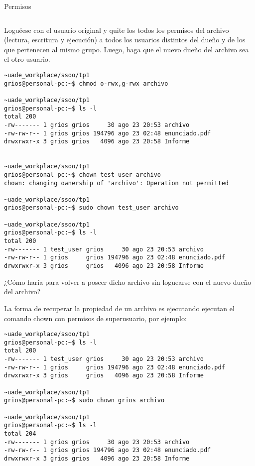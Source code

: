 \begin{section}{Permisos}
\begin{lstlisting}[style=Ubuntu]
\end{lstlisting}

\begin{quoting}
Loguéese con el usuario original y quite los todos los permisos del archivo (lectura, escritura y
ejecución) a todos los usuarios distintos del dueño y de los que pertenecen al mismo grupo. Luego, haga que
el nuevo dueño del archivo sea el otro usuario.
\end{quoting}

\begin{lstlisting}[style=Ubuntu]
~uade_workplace/ssoo/tp1
grios@personal-pc:~$ chmod o-rwx,g-rwx archivo

~uade_workplace/ssoo/tp1
grios@personal-pc:~$ ls -l                     
total 200
-rw------- 1 grios grios     30 ago 23 20:53 archivo
-rw-rw-r-- 1 grios grios 194796 ago 23 02:48 enunciado.pdf
drwxrwxr-x 3 grios grios   4096 ago 23 20:58 Informe


~uade_workplace/ssoo/tp1
grios@personal-pc:~$ chown test_user archivo
chown: changing ownership of 'archivo': Operation not permitted

~uade_workplace/ssoo/tp1
grios@personal-pc:~$ sudo chown test_user archivo

~uade_workplace/ssoo/tp1
grios@personal-pc:~$ ls -l
total 200
-rw------- 1 test_user grios     30 ago 23 20:53 archivo
-rw-rw-r-- 1 grios     grios 194796 ago 23 02:48 enunciado.pdf
drwxrwxr-x 3 grios     grios   4096 ago 23 20:58 Informe

\end{lstlisting}

\begin{quoting}
¿Cómo haría para volver a poseer dicho archivo sin loguearse con el nuevo dueño del archivo?
\end{quoting}

La forma de recuperar la propiedad de un archivo es ejecutando ejecutan el comando chown con permisos de superusuario, por ejemplo:

\begin{lstlisting}[style=Ubuntu]
~uade_workplace/ssoo/tp1
grios@personal-pc:~$ ls -l
total 200
-rw------- 1 test_user grios     30 ago 23 20:53 archivo
-rw-rw-r-- 1 grios     grios 194796 ago 23 02:48 enunciado.pdf
drwxrwxr-x 3 grios     grios   4096 ago 23 20:58 Informe

~uade_workplace/ssoo/tp1
grios@personal-pc:~$ sudo chown grios archivo

~uade_workplace/ssoo/tp1
grios@personal-pc:~$ ls -l
total 204
-rw------- 1 grios grios     30 ago 23 20:53 archivo
-rw-rw-r-- 1 grios grios 194796 ago 23 02:48 enunciado.pdf
drwxrwxr-x 3 grios grios   4096 ago 23 20:58 Informe


\end{lstlisting}
\end{section}
